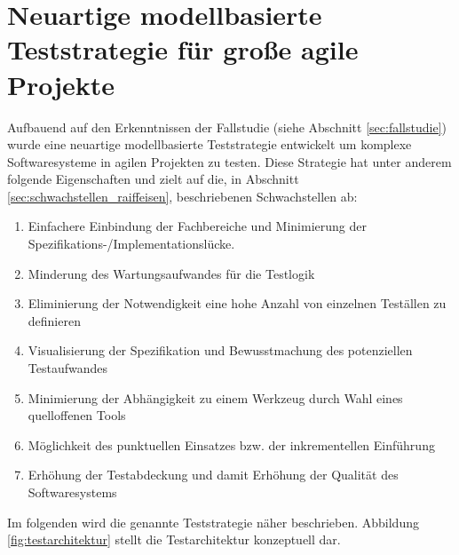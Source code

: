 \chapter{Neuartige modellbasierte Teststrategie für große agile Projekte}
\label{sec:results}

Aufbauend auf den Erkenntnissen der Fallstudie (siehe Abschnitt \ref{sec:fallstudie}) wurde eine neuartige modellbasierte Teststrategie entwickelt um komplexe Softwaresysteme in agilen Projekten zu testen. Diese Strategie hat unter anderem folgende Eigenschaften und zielt auf die, in Abschnitt \ref{sec:schwachstellen_raiffeisen}, beschriebenen Schwachstellen ab:

\begin{enumerate}
\item Einfachere Einbindung der Fachbereiche und Minimierung der Spezifikations-/Implementationslücke.
\item Minderung des Wartungsaufwandes für die Testlogik
\item Eliminierung der Notwendigkeit eine hohe Anzahl von einzelnen Teställen zu definieren
\item Visualisierung der Spezifikation und Bewusstmachung des potenziellen Testaufwandes
\item Minimierung der Abhängigkeit zu einem Werkzeug durch Wahl eines quelloffenen Tools
\item Möglichkeit des punktuellen Einsatzes bzw. der inkrementellen Einführung
\item Erhöhung der Testabdeckung und damit Erhöhung der Qualität des Softwaresystems
\end{enumerate}

Im folgenden wird die genannte Teststrategie näher beschrieben. Abbildung \ref{fig:testarchitektur} stellt die Testarchitektur konzeptuell dar.

